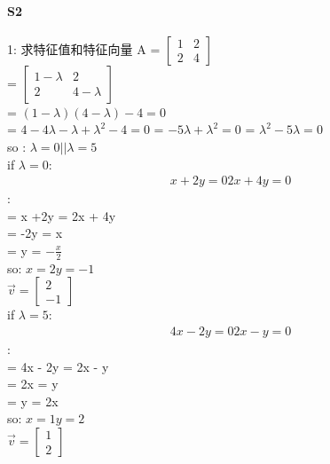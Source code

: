 \documentclass[12pt]{article}
\begin{document}
\paragraph{S2}
\begin{flushleft}
    1: 求特征值和特征向量 A = $\begin{bmatrix}
            1 & 2 \\
            2 & 4
        \end{bmatrix}$ \\
    = $\begin{bmatrix}
            1 - \lambda & 2          \\
            2           & 4- \lambda
        \end{bmatrix}$ \\
    = $(1 - \lambda)(4 - \lambda) - 4 = 0$  \\
    = $ 4- 4 \lambda - \lambda  +\lambda^{2} - 4 = 0$
    = $ -5 \lambda  + \lambda^{2} = 0$
    = $\lambda^{2} - 5\lambda = 0$ \\
    so : $\lambda = 0  || \lambda = 5$ \\
    if $\lambda = 0$:  \\
    \begin{align}
        x + 2y = 0
        2x + 4y = 0
    \end{align} : \\
    = x +2y = 2x + 4y  \\
    = -2y = x \\
    = y = $-\frac{x}{2}$ \\
    so: $x = 2  y= -1$ \\
    $\vec{v} = \begin{bmatrix}
            2 \\
            -1
        \end{bmatrix}$ \\
    if $\lambda = 5$:  \\
    \begin{align}
        4x - 2y = 0
        2x -y = 0
    \end{align} : \\
    = 4x - 2y = 2x - y  \\
    = 2x = y \\
    = y = 2x \\
    so: $x = 1  y= 2$ \\
    $\vec{v} = \begin{bmatrix}
            1 \\
            2
        \end{bmatrix}$ \\


\end{flushleft}
\end{document}
